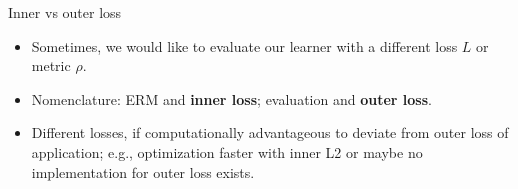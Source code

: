 \begin{vbframe}{Inner vs outer loss}

\begin{itemize}
  \item Sometimes, we would like to evaluate our learner with a different 
      loss $L$ or metric $\rho$.
  \item Nomenclature: ERM and \textbf{inner loss}; evaluation and \textbf{outer loss}. 
  \item Different losses, if computationally advantageous to deviate from outer loss of application; 
      e.g., optimization faster with inner L2 or maybe no implementation for outer loss exists.
\end{itemize}

\vfill


\end{vbframe}
